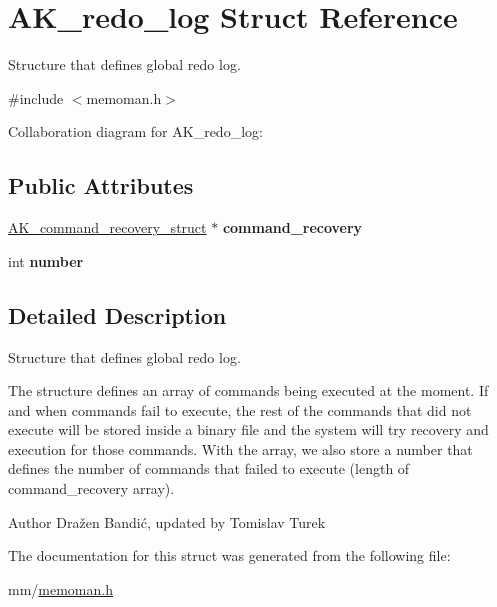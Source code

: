 \hypertarget{structAK__redo__log}{\section{A\+K\+\_\+redo\+\_\+log Struct Reference}
\label{structAK__redo__log}
}


Structure that defines global redo log.  




{\ttfamily \#include $<$memoman.\+h$>$}



Collaboration diagram for A\+K\+\_\+redo\+\_\+log\+:
\subsection*{Public Attributes}
\begin{DoxyCompactItemize}
\item 
\hypertarget{structAK__redo__log_af0118d6a67f343d263618542709b856f}{\hyperlink{structAK__command__recovery__struct}{A\+K\+\_\+command\+\_\+recovery\+\_\+struct} $\ast$ {\bfseries command\+\_\+recovery}}\label{structAK__redo__log_af0118d6a67f343d263618542709b856f}

\item 
\hypertarget{structAK__redo__log_acbe6ec888664705a9a2e13c5a70e0c8a}{int {\bfseries number}}\label{structAK__redo__log_acbe6ec888664705a9a2e13c5a70e0c8a}

\end{DoxyCompactItemize}


\subsection{Detailed Description}
Structure that defines global redo log. 

The structure defines an array of commands being executed at the moment. If and when commands fail to execute, the rest of the commands that did not execute will be stored inside a binary file and the system will try recovery and execution for those commands. With the array, we also store a number that defines the number of commands that failed to execute (length of command\+\_\+recovery array). \begin{DoxyAuthor}{Author}
Dražen Bandić, updated by Tomislav Turek 
\end{DoxyAuthor}


The documentation for this struct was generated from the following file\+:\begin{DoxyCompactItemize}
\item 
mm/\hyperlink{memoman_8h}{memoman.\+h}\end{DoxyCompactItemize}
